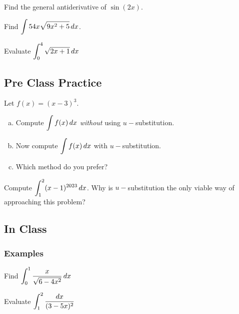 \documentclass[notes]{subfiles}
\begin{document}
		\begin{ex}
			Find the general antiderivative of \(\sin (2x)\).
		\end{ex}
			\newpage
			
		\begin{ex}
			Find \(\displaystyle \int 54x\sqrt{9x^2 + 5}\, dx\).
		\end{ex}
		
		\begin{ex}
			Evaluate \(\displaystyle \int_0^4 \sqrt{2x+1}\,dx\)
		\end{ex}
			\newpage
			
		
	
	\subsection*{Pre Class Practice}
		\begin{ex}
			Let \(f(x) = (x-3)^3\).
			\begin{enumerate}[(a)]
				\item Compute \(\displaystyle \int f(x)\, dx\) \emph{without} using \(u-\)substitution.
					
				\item Now compute \(\displaystyle \int f(x)\, dx\) with \(u-\)substitution.
					
				\item Which method do you prefer?
			\end{enumerate}
		\end{ex}
			
		\begin{ex}
			Compute \(\displaystyle \int_1^2 (x-1)^{2023}\, dx\).  Why is \(u-\)substitution the only viable way of approaching this problem?
		\end{ex}
			\vs{1}		
			\newpage
	
	\subsection*{In Class}	
	\subsubsection*{Examples}
		\begin{ex}
			Find \(\displaystyle \int_0^1 \dfrac{x}{\sqrt{6-4x^2}}\,dx\)
		\end{ex}
			
		\begin{ex}
			Evaluate \(\displaystyle \int_1^2 \dfrac{dx}{(3-5x)^2}\)
		\end{ex}
			 
\end{document}
